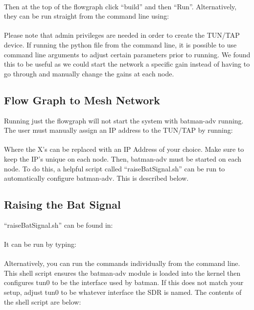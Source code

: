  \\

Then at the top of the flowgraph click ``build'' and then ``Run''. Alternatively, they can be run straight from the command line using: \\

 \\

Please note that admin privileges are needed in order to create the TUN/TAP device. If running the python file from the command line, it is possible to use command line arguments to adjust certain parameters prior to running. We found this to be useful as we could start the network a specific gain instead of having to go through and manually change the gains at each node. 

\subsection{Flow Graph to Mesh Network}

Running just the flowgraph will not start the system with batman-adv running. The user must manually assign an IP address to the TUN/TAP by running: \\

 \\

Where the X's can be replaced with an IP Address of your choice. Make sure to keep the IP's unique on each node. Then, batman-adv must be started on each node. To do this, a helpful script called ``raiseBatSignal.sh'' can be run to automatically configure batman-adv. This is described below. 

\subsection{Raising the Bat Signal}

``raiseBatSignal.sh'' can be found in: \\ 

 \\

It can be run by typing: \\

 \\

Alternatively, you can run the commands individually from the command line. This shell script ensures the batman-adv module is loaded into the kernel then configures tun0 to be the interface used by batman. If this does not match your setup, adjust tun0 to be whatever interface the SDR is named. The contents of the shell script are below:

